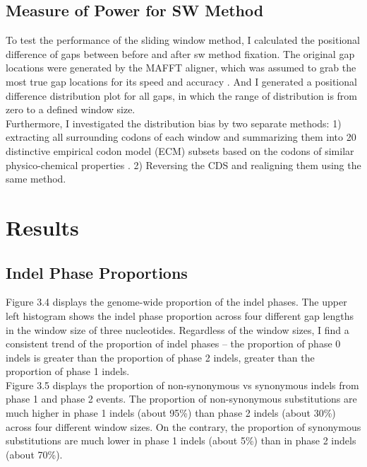\subsection{Measure of Power for SW Method}
To test the performance of the sliding window method, I calculated the positional difference of gaps between before and after sw method fixation. The original gap locations were generated by the MAFFT aligner, which was assumed to grab the most true gap locations for its speed and accuracy \parencite{katoh2005mafft}. And I generated a positional difference distribution plot for all gaps, in which the range of distribution is from zero to a defined window size. \\
\indent Furthermore, I investigated the distribution bias by two separate methods: 1) extracting all surrounding codons of each window and summarizing them into 20 distinctive empirical codon model (ECM) subsets based on the codons of similar physico-chemical properties \parencite{kosiol2007empirical}. 2) Reversing the CDS and realigning them using the same method.   

\section{Results}
\subsection{Indel Phase Proportions}
Figure 3.4 displays the genome-wide proportion of the indel phases. The upper left histogram shows the indel phase proportion across four different gap lengths in the window size of three nucleotides. Regardless of the window sizes, I find a consistent trend of the proportion of indel phases -- the proportion of phase 0 indels is greater than the proportion of phase 2 indels, greater than the proportion of phase 1 indels.\\
\indent Figure 3.5 displays the proportion of non-synonymous vs synonymous indels from phase 1 and phase 2 events. The proportion of non-synonymous substitutions are much higher in phase 1 indels (about 95\%) than phase 2 indels (about 30\%) across four different window sizes. On the contrary, the proportion of synonymous substitutions are much lower in phase 1 indels (about 5\%) than in phase 2 indels (about 70\%). 

